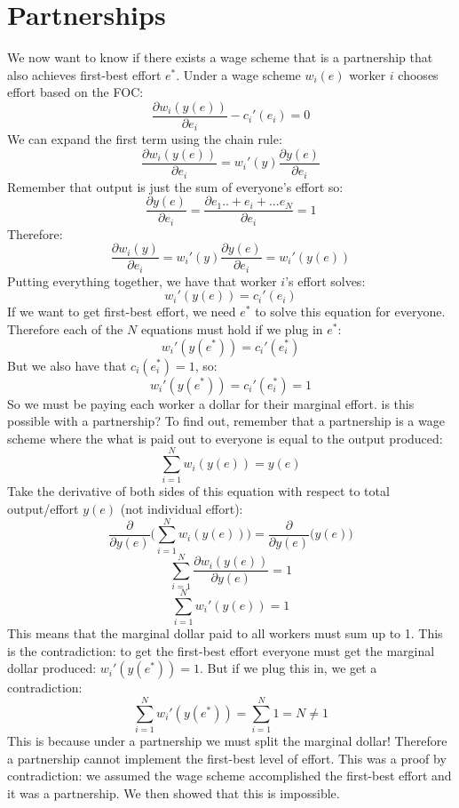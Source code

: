 \documentclass{article}
\begin{document}
\section{Partnerships}


We now want to know if there exists a wage scheme that is a partnership that also achieves first-best effort $e^*$. Under a wage scheme $w_i(e)$ worker $i$ chooses effort based on the FOC:
\[\frac{\partial w_i(y(e))}{\partial e_i}-c_i'(e_i)=0\]
We can expand the first term using the chain rule:
\[\frac{\partial w_i(y(e))}{\partial e_i}=w_i'(y) \frac{\partial y(e)}{\partial e_i} \]
Remember that output is just the sum of everyone's effort so:
\[\frac{\partial y(e)}{\partial e_i} = \frac{\partial e_1..+e_i+...e_N}{\partial e_i}= 1 \]
Therefore:
\[\frac{\partial w_i(y)}{\partial e_i}=w_i'(y) \frac{\partial y(e)}{\partial e_i} = w_i'(y(e))\]
Putting everything together, we have that worker $i$'s effort solves:
\[ w_i'(y(e)) =c_i'(e_i) \]
If we want to get first-best effort, we need $e^*$ to solve this equation for everyone. Therefore each of the $N$ equations must hold if we plug in $e^*$:
\[ w_i'(y(e^*)) =c_i'(e_i^*) \]
But we also have that $c_i(e^*_i)=1$, so:
\[ w_i'(y(e^*)) =c_i'(e_i^*)=1 \]
So we must be paying each worker a dollar for their marginal effort. is this possible with a partnership? To find out, remember that a partnership is a wage scheme where the what is paid out to everyone is equal to the output produced:
\[\sum_{i=1}^N w_i(y(e))=y(e)\]
Take the derivative of both sides of this equation with respect to total output/effort $y(e)$ (not individual effort):
\[ \frac{\partial } {\partial y(e)} \bigg ( \sum_{i=1}^N w_i(y(e)) \bigg )=\frac{\partial } {\partial y(e)} \bigg ( y(e) \bigg ) \]
\[  \sum_{i=1}^N \frac{\partial w_i(y(e))} {\partial y(e)}  =1 \]
\[  \sum_{i=1}^N w_i'(y(e))  =1 \]
This means that the marginal dollar paid to all workers must sum up to 1. This is the contradiction: to get the first-best effort everyone must get the marginal dollar produced: $w_i'(y(e^*))=1$. But if we plug this in, we get a contradiction:
\[  \sum_{i=1}^N w_i'(y(e^*)) = \sum_{i=1}^N 1=N  \neq 1 \]
This is because under a partnership we must split the marginal dollar! Therefore a partnership cannot implement the first-best level of effort. This was a proof by contradiction: we assumed the wage scheme accomplished the first-best effort and it was a partnership. We then showed that this is impossible.
\end{document}
